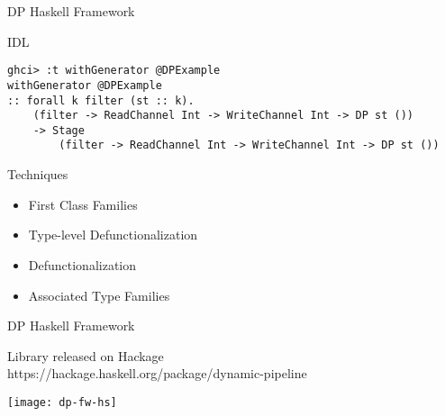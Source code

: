 \begin{frame}[fragile]{DP Haskell Framework}
  \begin{block}{IDL}
    \begin{verbatim}      
ghci> :t withGenerator @DPExample
withGenerator @DPExample
:: forall k filter (st :: k).
    (filter -> ReadChannel Int -> WriteChannel Int -> DP st ())
    -> Stage
        (filter -> ReadChannel Int -> WriteChannel Int -> DP st ())    
  \end{verbatim}
\end{block}
\begin{block}{Techniques}
  \begin{itemize}
    \item First Class Families
    \item Type-level Defunctionalization 
    \item Defunctionalization
    \item Associated Type Families
  \end{itemize}
\end{block}
\end{frame}

\begin{frame}[fragile]{DP Haskell Framework}
  \begin{block}{}
    Library released on Hackage \\
    https://hackage.haskell.org/package/dynamic-pipeline
    \begin{center}
      \texttt{[image: dp-fw-hs]}
    \end{center}  
  \end{block}
\end{frame}

